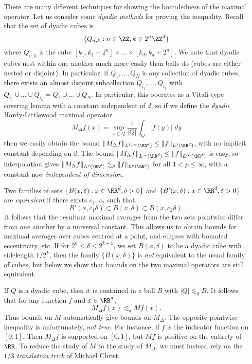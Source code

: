 There are many different techniques for showing the boundedness of the maximal operator. Let us consider some \emph{dyadic methods} for proving the inequality. Recall that the set of dyadic cubes is
%
\[ \{ Q_{n,k} : n \in \ZZ, k \in 2^n \ZZ^d \} \]
%
where $Q_{n,k}$ is the cube $[k_1, k_1 + 2^n] \times \dots \times [k_d, k_d + 2^n]$. We note that dyadic cubes nest within one another much more easily than balls do (cubes are either nested or disjoint). In particular, if $Q_1,\dots,Q_N$ is any collection of dyadic cubes, there exists an almost disjoint subcollection $Q_{i_1}, \dots, Q_{i_k}$ with $Q_{i_1} \cup \dots \cup Q_{i_k} = Q_1 \cup \dots \cup Q_N$. In particular, this operates as a Vitali-type covering lemma with a constant independent of $d$, so if we define the \emph{dyadic} Hardy-Littlewood maximal operator
%
\[ M_\Delta f(x) = \sup_{x \in Q} \frac{1}{|Q|} \int_Q |f(y)|\; dy \]
%
then we easily obtain the bound $\| M_\Delta f \|_{L^{1,\infty}(\RR^d)} \leq \| f \|_{L^1(\RR^d)}$, with no implicit constant depending on $d$. The bound $\| M_\Delta f \|_{L^\infty(\RR^d)} \leq \| f \|_{L^\infty(\RR^d)}$ is easy, so interpolation gives $\| M_\Delta f \|_{L^p(\RR^d)} \lesssim_p \| f \|_{L^p(\RR^d)}$ for all $1 < p \leq \infty$, with a constant now \emph{independent of dimension}.

Two families of sets $\{ B(x,\delta) : x \in \RR^d, \delta > 0 \}$ and $\{ B'(x,\delta) : x \in \RR^d, \delta > 0 \}$ are \emph{equivalent} if there exists $c_1$, $c_2$ such that
%
\[ B'(x, c_1 \delta) \subset B(x,\delta) \subset B(x,c_2 \delta). \]
%
It follows that the resultant maximal averages from the two sets pointwise differ from one another by a universal constant. This allows us to obtain bounds for maximal averages over cubes centred at a point, and ellipses with bounded eccentricity, etc. If for $2^k \leq \delta \leq 2^{k+1}$, we set $B(x,\delta)$ to be a dyadic cube with sidelength $1/2^k$, then the family $\{ B(x,\delta) \}$ is \emph{not} equivalent to the usual family of cubes, but below we show that bounds on the two maximal operators are still equivalent.

If $Q$ is a dyadic cube, then it is contained in a ball $B$ with $|Q| \lesssim_d B$. It follows that for any function $f$ and $x \in \RR^d$,
%
\[ M_\Delta f(x) \lesssim_d Mf(x). \]
%
Thus bounds on $M$ automatically give bounds on $M_\Delta$. The opposite pointwise inequality is unfortunately, \emph{not true}. For instance, if $f$ is the indicator function on $[0,1]$. Then $M_\Delta f$ is supported on $[0,1]$, but $Mf$ is positive on the entirety of $\RR$. To reduce the study of $M$ to the study of $M_\Delta$, we must instead rely on the \emph{$1/3$ translation trick} of Michael Christ.

